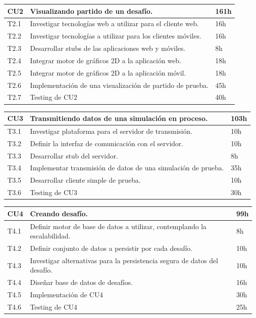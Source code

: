 \documentclass[a4paper, 10pt, twoside]{article}
\begin{document}
\begin{tabular}{lp{13cm}l}
  \hline
  CU2 & Visualizando partido de un desafío. & 161h \\
  \hline
  T2.1 & Investigar tecnologías web a utilizar para el cliente web. & 16h \\
  T2.2 & Investigar tecnologías a utilizar para los clientes móviles. & 16h \\
  T2.3 & Desarrollar stubs de las aplicaciones web y móviles. & 8h \\
  T2.4 & Integrar motor de gráficos 2D a la aplicación web. & 18h \\
  T2.5 & Integrar motor de gráficos 2D a la aplicación móvil. & 18h \\
  T2.6 & Implementación de una visualización de partido de prueba. & 45h \\
  T2.7 & Testing de CU2 & 40h\\
  \hline
\end{tabular}

\vspace{1em}

\begin{tabular}{lp{13cm}l}
  \hline
  CU3 & Transmitiendo datos de una simulación en proceso. & 103h \\
  \hline
  T3.1 & Investigar plataforma para el servidor de transmisión. & 10h \\
  T3.2 & Definir la interfaz de comunicación con el servidor. & 10h \\
  T3.3 & Desarrollar stub del servidor. & 8h \\
  T3.4 & Implementar transmisión de datos de una simulación de prueba. & 35h \\
  T3.5 & Desarrollar cliente simple de prueba. & 10h \\
  T3.6 & Testing de CU3 & 30h\\
  \hline
\end{tabular}

\vspace{1em}

\begin{tabular}{lp{13cm}l}
  \hline
  CU4 & Creando desafío. & 99h \\
  \hline
  T4.1 & Definir motor de base de datos a utilizar, contemplando la escalabilidad. & 8h \\
  T4.2 & Definir conjunto de datos a persistir por cada desafío. & 10h \\
  T4.3 & Investigar alternativas para la persistencia segura de datos del desafío. & 10h \\
  T4.4 & Diseñar base de datos de desafíos. & 16h \\
  T4.5 & Implementación de CU4 & 30h\\
  T4.6 & Testing de CU4 & 25h\\
  \hline
\end{tabular}
\end{document}

